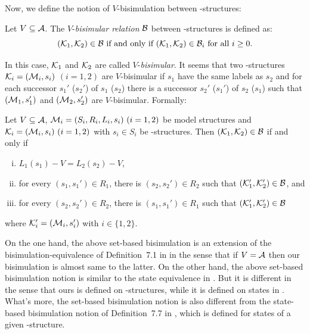 \documentclass{article}
\begin{document}
Now, we define the notion of $V$-bisimulation between \MPK-structures:
\begin{definition}[$V$-bisimulation]
  \label{def:V-bisimulation}
   Let $V\subseteq\cal A$. The $V$-{\em bisimular relation} ${\cal B}$ between
   \MPK-structures is defined as:
  \[({\cal K}_1,{\cal K}_2)\in {\cal B}\mbox{ if and only if } ({\cal K}_1,{\cal K}_2)\in {{\cal B}_i}\mbox{ for all }i\ge 0.\]
\end{definition}
%
 In this case, ${\cal K}_1$ and ${\cal K}_2$ are called $V$-{\em bisimular}.
It seems that two \MPK-structures ${\cal K}_i= ({\cal M}_i, s_i)$ $(i = 1,2)$ are $V$-bisimular if $s_1$ have the same labels as $s_2$ and for each successor $s_1'$ ($s_2'$) of $s_1$ ($s_2$) there is a successor $s_2'$ ($s_1'$) of $s_2$ ($s_1$) such that $({\cal M}_1, s_1')$ and $({\cal M}_2, s_2')$ are $V$-bisimular. Formally:
 \begin{proposition}\label{Vbi:Equ}
Let $V\subseteq\cal A$, ${\cal M}_i=(S_i,R_i,L_i,s_i)~(i=1,2)$ be model structures
and ${\cal K}_i=({\cal M}_i,s_i)~(i=1,2)$ with $s_i \in S_i$ be \MPK-structures.
Then $({\cal K}_1,{\cal K}_2)\in\cal B$ if and only if
  \begin{enumerate}[(i)]
    \item $L_1(s_1)- V = L_2(s_2)-V$,
    \item for every $(s_1,s_1')\in R_1$, there is $(s_2,s_2')\in R_2$
    such that $({\cal K}_1',{\cal K}_2')\in {\cal B}$, and
    \item for every $(s_2,s_2')\in R_2$, there is $(s_1,s_1')\in R_1$
    such that $({\cal K}_1',{\cal K}_2')\in {\cal B}$
   \end{enumerate}
 where ${\cal K}_i'=({\cal M}_i,s_i')$ with $i\in\{1,2\}$.
\end{proposition}

On the one hand, the above set-based bisimulation is an extension of the
bisimulation-equivalence of Definition~7.1 in \cite{Baier:PMC:2008} in the
sense that if $V=\cal A$ then our bisimulation is almost same to the
latter.
On the other hand, the above set-based bisimulation notion is similar to
the state equivalence in \cite{DBLP:journals/tcs/BrowneCG88}. But it is
different in the sense that ours is defined on \MPK-structures,
while it is defined on states in \cite{DBLP:journals/tcs/BrowneCG88}.
What's more, the set-based bisimulation notion is also different
from  the state-based bisimulation notion of Definition~7.7 in \cite{Baier:PMC:2008},
which is defined for states of a given \MPK-structure.
\end{document}
